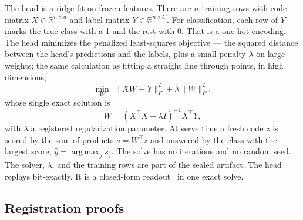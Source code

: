 \documentclass[11pt]{article}
\DeclareMathOperator{\argmax}{arg\,max}
\begin{document}
The head is a ridge fit on frozen features. There are $n$
training rows with code matrix $X \in \mathbb{R}^{n \times d}$
and label matrix $Y \in \mathbb{R}^{n \times C}$. For
classification, each row of $Y$ marks the true class with a 1
and the rest with 0. That is a one-hot encoding. The head
minimizes the penalized least-squares objective --- the squared
distance between the head's predictions and the labels, plus a
small penalty $\lambda$ on large weights; the same calculation
as fitting a straight line through points, in high dimensions,
\begin{equation}
\min_{W} \; \| XW - Y \|_F^2 + \lambda \| W \|_F^2,
\end{equation}
whose single exact solution is
\begin{equation}
W = (X^\top X + \lambda I)^{-1} X^\top Y,
\end{equation}
with $\lambda$ a registered regularization parameter. At serve
time a fresh code $z$ is scored by the sum of products
$s = W^\top z$ and answered by the class with the largest
score, $\hat y = \argmax_j s_j$. The
solve has no iterations and no random seed. The solver,
$\lambda$, and the training rows are part of the sealed
artifact. The head replays bit-exactly. It is a closed-form
readout~\cite{belrose2023} in one exact solve.

\subsection{Registration proofs}
\end{document}
